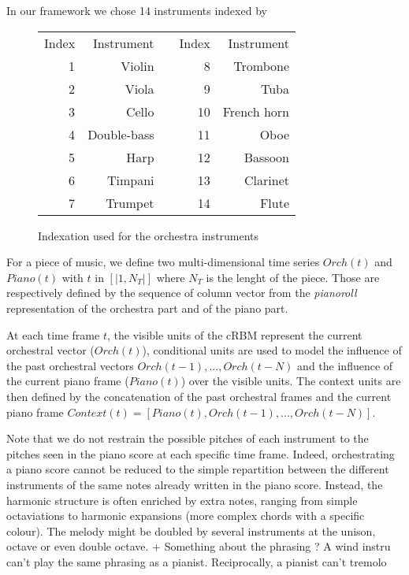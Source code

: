 \documentclass[letterpaper]{article}
\begin{document}
In our framework we chose 14 instruments indexed by 
\begin{figure}
\begin{center}
\begin{tabular}{|r|r|c|r|r|}
\cline{1-2}
\cline{4-5}
\rule{0pt}{2.5ex} Index & Instrument & & Index & Instrument\\
\cline{1-2}
\cline{4-5}
\rule{0pt}{2.5ex} 1 & Violin & & 8 & Trombone\\
2 & Viola & & 9 & Tuba\\
3 & Cello &  & 10 & French horn\\
4 & Double-bass & & 11 & Oboe\\
5 & Harp & & 12 & Bassoon\\
6 & Timpani & & 13 & Clarinet\\
7 & Trumpet & & 14 & Flute\\
\cline{1-2}
\cline{4-5}
\end{tabular}
\end{center}
\caption{Indexation used for the orchestra instruments}
\end{figure}

For a piece of music, we define two multi-dimensional time series $Orch(t)$ and $Piano(t)$ with $t$ in $\left[ | 1 , N_{T} | \right]$ where $N_{T}$ is the lenght of the piece. Those are respectively defined by the sequence of column vector from the \textit{pianoroll} representation of the orchestra part and of the piano part.

At each time frame $t$, the visible units of the cRBM represent the current orchestral vector ($Orch(t)$), conditional units are used to model the influence of the past orchestral vectors $Orch(t-1) , ... , Orch(t-N)$ and the influence of the current piano frame ($Piano(t)$) over the visible units. The context units are then defined by the concatenation of the past orchestral frames and the current piano frame
$ Context(t) = \left[ Piano(t) , Orch(t-1) , ... , Orch(t-N)\right]$.


Note that we do not restrain the possible pitches of each instrument to the pitches seen in the piano score at each specific time frame. Indeed, orchestrating a piano score cannot be reduced to the simple repartition between the different instruments of the same notes already written in the piano score. Instead, the harmonic structure is often enriched by extra notes, ranging from simple octaviations to harmonic expansions (more complex chords with a specific colour). The melody might be doubled by several instruments at the unison, octave or even double octave.
+ Something about the phrasing ? A wind instru can't play the same phrasing as a pianist. Reciprocally, a pianist can't tremolo
\end{document}
